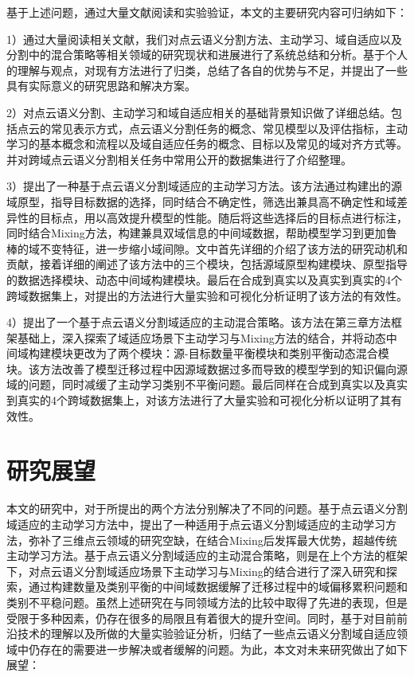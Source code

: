 基于上述问题，通过大量文献阅读和实验验证，本文的主要研究内容可归纳如下：

1）通过大量阅读相关文献，我们对点云语义分割方法、主动学习、域自适应以及分割中的混合策略等相关领域的研究现状和进展进行了系统总结和分析。基于个人的理解与观点，对现有方法进行了归类，总结了各自的优势与不足，并提出了一些具有实际意义的研究思路和解决方案。

2）对点云语义分割、主动学习和域自适应相关的基础背景知识做了详细总结。包括点云的常见表示方式，点云语义分割任务的概念、常见模型以及评估指标，主动学习的基本概念和流程以及域自适应任务的概念、目标以及常见的域对齐方式等。并对跨域点云语义分割相关任务中常用公开的数据集进行了介绍整理。

3）提出了一种基于点云语义分割域适应的主动学习方法。该方法通过构建出的源域原型，指导目标数据的选择，同时结合不确定性，筛选出兼具高不确定性和域差异性的目标点，用以高效提升模型的性能。随后将这些选择后的目标点进行标注，同时结合Mixing方法，构建兼具双域信息的中间域数据，帮助模型学习到更加鲁棒的域不变特征，进一步缩小域间隙。文中首先详细的介绍了该方法的研究动机和贡献，接着详细的阐述了该方法中的三个模块，包括源域原型构建模块、原型指导的数据选择模块、动态中间域构建模块。最后在合成到真实以及真实到真实的4个跨域数据集上，对提出的方法进行大量实验和可视化分析证明了该方法的有效性。

4）提出了一个基于点云语义分割域适应的主动混合策略。该方法在第三章方法框架基础上，深入探索了域适应场景下主动学习与Mixing方法的结合，并将动态中间域构建模块更改为了两个模块：源-目标数量平衡模块和类别平衡动态混合模块。该方法改善了模型迁移过程中因源域数据过多而导致的模型学到的知识偏向源域的问题，同时减缓了主动学习类别不平衡问题。最后同样在合成到真实以及真实到真实的4个跨域数据集上，对该方法进行了大量实验和可视化分析以证明了其有效性。



\section{研究展望}
本文的研究中，对于所提出的两个方法分别解决了不同的问题。基于点云语义分割域适应的主动学习方法中，提出了一种适用于点云语义分割域适应的主动学习方法，弥补了三维点云领域的研究空缺，在结合Mixing后发挥最大优势，超越传统主动学习方法。基于点云语义分割域适应的主动混合策略，则是在上个方法的框架下，对点云语义分割域适应场景下主动学习与Mixing的结合进行了深入研究和探索，通过构建数量及类别平衡的中间域数据缓解了迁移过程中的域偏移累积问题和类别不平稳问题。虽然上述研究在与同领域方法的比较中取得了先进的表现，但是受限于多种因素，仍存在很多的局限且有着很大的提升空间。同时，基于对目前前沿技术的理解以及所做的大量实验验证分析，归结了一些点云语义分割域自适应领域中仍存在的需要进一步解决或者缓解的问题。为此，本文对未来研究做出了如下展望：

